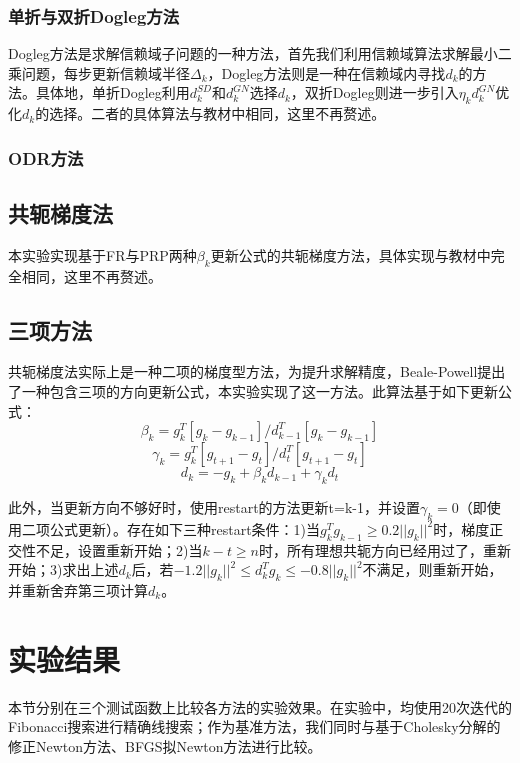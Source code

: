 \documentclass{article}
\begin{document}
\subsubsection{单折与双折Dogleg方法}
Dogleg方法是求解信赖域子问题的一种方法，首先我们利用信赖域算法求解最小二乘问题，每步更新信赖域半径$\Delta_k$，Dogleg方法则是一种在信赖域内寻找$d_k$的方法。具体地，单折Dogleg利用$d_k^{SD}$和$d_k^{GN}$选择$d_k$，双折Dogleg则进一步引入$\eta_k d_k^{GN}$优化$d_k$的选择。二者的具体算法与教材中相同，这里不再赘述。

\subsubsection{ODR方法}

\subsection{共轭梯度法}
本实验实现基于FR与PRP两种$\beta_k$更新公式的共轭梯度方法，具体实现与教材中完全相同，这里不再赘述。

\subsection{三项方法}
共轭梯度法实际上是一种二项的梯度型方法，为提升求解精度，Beale-Powell提出了一种包含三项的方向更新公式，本实验实现了这一方法。此算法基于如下更新公式：
\[ \beta_k = g_k^T [g_k - g_{k-1}] / d_{k-1}^T [g_k - g_{k-1}] \]
\[ \gamma_k = g_k^T [g_{t+1} - g_t] / d_t^T [g_{t+1} - g_t] \]
\[ d_k = -g_k + \beta_k d_{k-1} + \gamma_k d_{t} \]

此外，当更新方向不够好时，使用restart的方法更新t=k-1，并设置$\gamma_k=0$（即使用二项公式更新）。存在如下三种restart条件：1)当$g_k^T g_{k-1} \geq 0.2 ||g_k||^2$时，梯度正交性不足，设置重新开始；2)当$k-t\geq n$时，所有理想共轭方向已经用过了，重新开始；3)求出上述$d_k$后，若$-1.2||g_k||^2\leq d_k^T g_k\leq -0.8||g_k||^2$不满足，则重新开始，并重新舍弃第三项计算$d_k$。


\section{实验结果}
本节分别在三个测试函数上比较各方法的实验效果。在实验中，均使用20次迭代的Fibonacci搜索进行精确线搜索；作为基准方法，我们同时与基于Cholesky分解的修正Newton方法、BFGS拟Newton方法进行比较。
\end{document}
